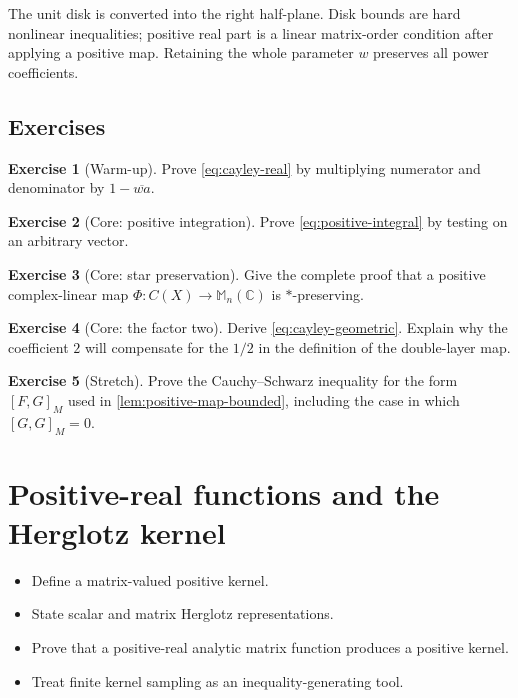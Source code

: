 \documentclass[11pt,oneside,openany]{book}
\theoremstyle{definition}
\newtheorem{exercise}{Exercise}[chapter]
\theoremstyle{remark}
\newcommand{\C}{\mathbb C}
\newcommand{\Mn}{\mathbb M_n(\C)}
\begin{document}
\begin{intuitionbox}
The unit disk is converted into the right half-plane.  Disk bounds are
hard nonlinear inequalities; positive real part is a linear
matrix-order condition after applying a positive map.  Retaining the
whole parameter \(w\) preserves all power coefficients.
\end{intuitionbox}

\section{Exercises}

\begin{exercise}[Warm-up]
Prove \eqref{eq:cayley-real} by multiplying numerator and denominator
by \(1-\overline{wa}\).
\end{exercise}

\begin{exercise}[Core: positive integration]
Prove \eqref{eq:positive-integral} by testing on an arbitrary vector.
\end{exercise}

\begin{exercise}[Core: star preservation]
Give the complete proof that a positive complex-linear map
\(\Phi:C(X)\to\Mn\) is \(*\)-preserving.
\end{exercise}

\begin{exercise}[Core: the factor two]
Derive \eqref{eq:cayley-geometric}.  Explain why the coefficient \(2\)
will compensate for the \(1/2\) in the definition of the double-layer
map.
\end{exercise}

\begin{exercise}[Stretch]
Prove the Cauchy--Schwarz inequality for the form
\([F,G]_M\) used in \cref{lem:positive-map-bounded}, including the
case in which \([G,G]_M=0\).
\end{exercise}

\chapter{Positive-real functions and the Herglotz kernel}
\label{ch:herglotz}

\begin{learninggoals}
\begin{itemize}
  \item Define a matrix-valued positive kernel.
  \item State scalar and matrix Herglotz representations.
  \item Prove that a positive-real analytic matrix function produces a
  positive kernel.
  \item Treat finite kernel sampling as an inequality-generating tool.
\end{itemize}
\end{learninggoals}
\end{document}
